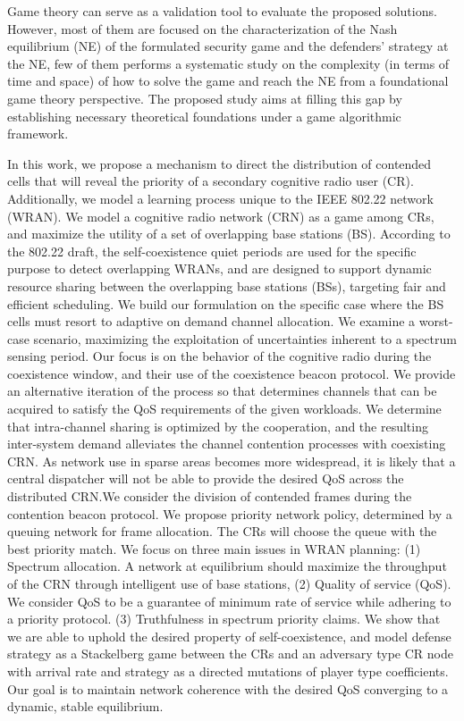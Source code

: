 \documentclass[10pt]{article}
\theoremstyle{definition}
\begin{document}
Game theory can serve as a validation tool to evaluate the proposed solutions.
However, most of them are focused on the characterization of the Nash equilibrium (NE) of the formulated security game and the defenders’ strategy at the NE, few of them performs a systematic study on the
complexity (in terms of time and space) of how to solve the game and reach the
NE from a foundational game theory perspective. The proposed study aims at
filling this gap by establishing necessary theoretical foundations under a game algorithmic framework.

In this work, we propose a mechanism to direct the distribution of contended cells that 
will reveal the priority of a secondary cognitive radio user (CR). Additionally, we model 
a learning process unique to the IEEE 802.22 network 
(WRAN). We model a cognitive radio network (CRN) as a game among CRs, and maximize the
 utility of a set of overlapping base stations (BS). According to the 802.22 draft, the 
self-coexistence quiet periods are used for the specific purpose to detect overlapping 
WRANs, and are designed to support dynamic resource sharing between the overlapping base
 stations (BSs), targeting fair and efficient scheduling. We build our formulation on 
the specific case where the BS cells must resort to adaptive on demand channel allocation.
 We examine a worst-case scenario, maximizing the exploitation of uncertainties inherent 
to a spectrum sensing period. Our focus is on the behavior of the cognitive radio 
during the coexistence window, and their use of the coexistence beacon protocol. 
We provide an alternative iteration of the process so that determines channels 
that can be acquired to satisfy the QoS requirements of the given workloads. We 
determine that intra-channel sharing is optimized by the cooperation, and the resulting 
inter-system demand alleviates the channel contention processes with coexisting CRN. 
As network use in sparse areas becomes more widespread, it is likely that a 
central dispatcher will not be able to provide the desired QoS across the distributed 
CRN.We consider the division of contended frames during the contention beacon protocol. 
We propose priority network policy, determined by a queuing network for frame 
allocation. The CRs will choose the queue with the best priority match. We focus on 
three main issues in WRAN planning: (1) Spectrum allocation. A network at equilibrium 
should maximize the throughput of the CRN through intelligent use of base stations, 
(2) Quality of service (QoS). We consider QoS to be a guarantee of minimum rate of 
service while adhering to a priority protocol. (3) Truthfulness in spectrum 
priority claims. We show that we are able to uphold the desired property of 
self-coexistence, and model defense strategy as a Stackelberg game between the CRs and 
an adversary type CR node with arrival rate and strategy as a directed mutations of 
player type coefficients. Our goal is to maintain network coherence with the desired 
QoS converging to a dynamic, stable equilibrium.
\end{document}
